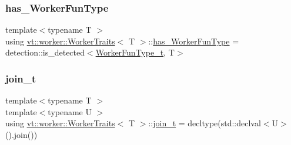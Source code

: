 \mbox{\label{structvt_1_1worker_1_1_worker_traits_a69eeffd4c60f5b1a129e20ef0a85827d}} 
\subsubsection{\texorpdfstring{has\+\_\+\+Worker\+Fun\+Type}{has\_WorkerFunType}}
{\footnotesize\ttfamily template$<$typename T $>$ \\
using \hyperlink{structvt_1_1worker_1_1_worker_traits}{vt\+::worker\+::\+Worker\+Traits}$<$ T $>$\+::\hyperlink{structvt_1_1worker_1_1_worker_traits_a69eeffd4c60f5b1a129e20ef0a85827d}{has\+\_\+\+Worker\+Fun\+Type} =  detection\+::is\+\_\+detected$<$\hyperlink{structvt_1_1worker_1_1_worker_traits_a62aa14ab158ff54d290cc2124c5ce3e1}{Worker\+Fun\+Type\+\_\+t}, T$>$}

\mbox{\label{structvt_1_1worker_1_1_worker_traits_a69a3d1b3845fdac60940d2b3e6a6b240}} 
\subsubsection{\texorpdfstring{join\+\_\+t}{join\_t}}
{\footnotesize\ttfamily template$<$typename T $>$ \\
template$<$typename U $>$ \\
using \hyperlink{structvt_1_1worker_1_1_worker_traits}{vt\+::worker\+::\+Worker\+Traits}$<$ T $>$\+::\hyperlink{structvt_1_1worker_1_1_worker_traits_a69a3d1b3845fdac60940d2b3e6a6b240}{join\+\_\+t} =  decltype(std\+::declval$<$U$>$().join())}

\mbox{\label{structvt_1_1worker_1_1_worker_traits_a0cda24a5c8ac86e6877aaa24b23034fd}} 
